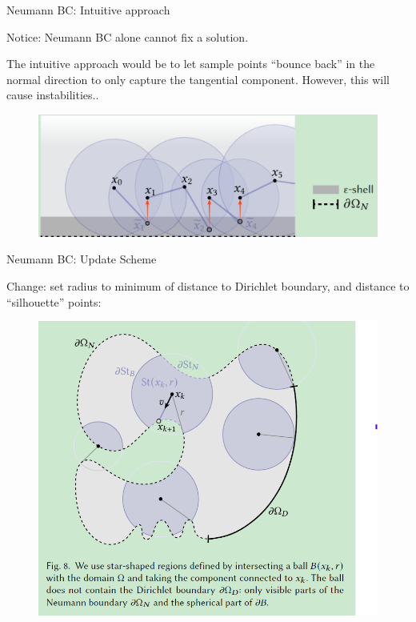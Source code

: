 \documentclass{beamer}
\begin{document}
\begin{frame}{Neumann BC: Intuitive approach}
	
	Notice: Neumann BC alone cannot fix a solution.

	The intuitive approach would be to let sample points ``bounce back'' in the normal direction to only capture the tangential component. However, this will cause instabilities..

	\begin{figure}[htbp]
		\centering
		\includegraphics[scale=0.4]{img/NBC-1.png}
	\end{figure}

\end{frame}

\begin{frame}{Neumann BC: Update Scheme}

	Change: set radius to minimum of distance to Dirichlet boundary, and distance to ``silhouette'' points: 

	\begin{figure}[htbp]
		\centering
		\includegraphics[scale=0.4]{img/NBC-2.png}
	\end{figure}

\end{frame}
\end{document}
